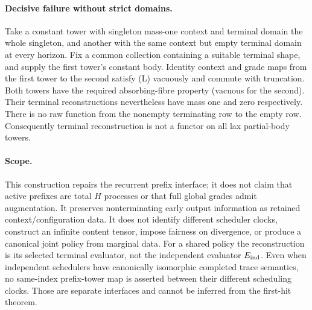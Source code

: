 \documentclass{article}
\begin{document}
\paragraph{Decisive failure without strict domains.}
Take a constant tower with singleton mass-one context and terminal domain
the whole singleton, and another with the same context but empty terminal
domain at every horizon. Fix a common collection containing a suitable
terminal shape, and supply the first tower's constant body. Identity context
and grade maps from the first tower to the second satisfy (L) vacuously and
commute with truncation. Both towers have the required absorbing-fibre
property (vacuous for the second). Their terminal reconstructions nevertheless
have mass one and zero respectively. There is no raw function from the
nonempty terminating row to the empty row. Consequently terminal
reconstruction is not a functor on all lax partial-body towers.

\paragraph{Scope.}
This construction repairs the recurrent prefix interface; it does not claim
that active prefixes are total $H$ processes or that full global grades admit
augmentation. It preserves nonterminating early output information as
retained context/configuration data. It does not identify different scheduler
clocks, construct an infinite content tensor, impose fairness on divergence,
or produce a canonical joint policy from marginal data. For a shared policy
the reconstruction is its selected terminal evaluator, not the independent
evaluator $E_{\rm ind}$. Even when independent schedulers have canonically
isomorphic completed trace semantics, no same-index prefix-tower map is
asserted between their different scheduling clocks. Those are separate
interfaces and cannot be inferred from the first-hit theorem.
\end{document}
